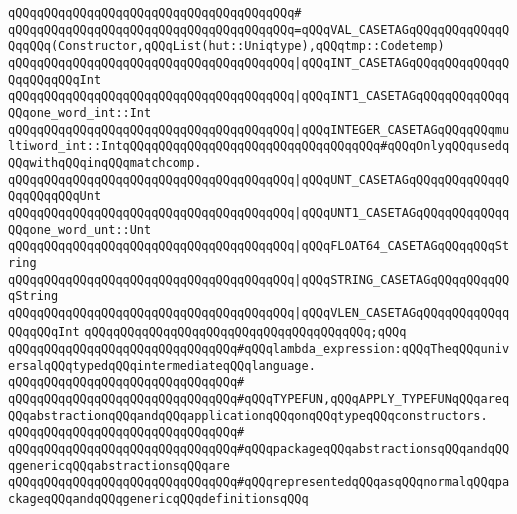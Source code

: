 \verb|qQQqqQQqqQQqqQQqqQQqqQQqqQQqqQQqqQQqqQQq#|\newline
\verb|qQQqqQQqqQQqqQQqqQQqqQQqqQQqqQQqqQQqqQQq=qQQqVAL_CASETAGqQQqqQQqqQQqqQQqqQQq(Constructor,qQQqList(hut::Uniqtype),qQQqtmp::Codetemp)|\newline
\verb|qQQqqQQqqQQqqQQqqQQqqQQqqQQqqQQqqQQqqQQq|\verb#|qQQqINT_CASETAGqQQqqQQqqQQqqQQqqQQqqQQqInt#\newline
\verb|qQQqqQQqqQQqqQQqqQQqqQQqqQQqqQQqqQQqqQQq|\verb#|qQQqINT1_CASETAGqQQqqQQqqQQqqQQqone_word_int::Int#\newline
\verb|qQQqqQQqqQQqqQQqqQQqqQQqqQQqqQQqqQQqqQQq|\verb#|qQQqINTEGER_CASETAGqQQqqQQqmultiword_int::IntqQQqqQQqqQQqqQQqqQQqqQQqqQQqqQQqqQQq#\verb|#qQQqOnlyqQQqusedqQQqwithqQQqinqQQqmatchcomp.|\newline
\verb|qQQqqQQqqQQqqQQqqQQqqQQqqQQqqQQqqQQqqQQq|\verb#|qQQqUNT_CASETAGqQQqqQQqqQQqqQQqqQQqqQQqUnt#\newline
\verb|qQQqqQQqqQQqqQQqqQQqqQQqqQQqqQQqqQQqqQQq|\verb#|qQQqUNT1_CASETAGqQQqqQQqqQQqqQQqone_word_unt::Unt#\newline
\verb|qQQqqQQqqQQqqQQqqQQqqQQqqQQqqQQqqQQqqQQq|\verb#|qQQqFLOAT64_CASETAGqQQqqQQqString#\newline
\verb|qQQqqQQqqQQqqQQqqQQqqQQqqQQqqQQqqQQqqQQq|\verb#|qQQqSTRING_CASETAGqQQqqQQqqQQqString#\newline
\verb|qQQqqQQqqQQqqQQqqQQqqQQqqQQqqQQqqQQqqQQq|\verb#|qQQqVLEN_CASETAGqQQqqQQqqQQqqQQqqQQqInt#\newline
\verb|qQQqqQQqqQQqqQQqqQQqqQQqqQQqqQQqqQQqqQQq;qQQq|\newline
\newline
\newline
\verb|qQQqqQQqqQQqqQQqqQQqqQQqqQQqqQQq#qQQqlambda_expression:qQQqTheqQQquniversalqQQqtypedqQQqintermediateqQQqlanguage.|\newline
\verb|qQQqqQQqqQQqqQQqqQQqqQQqqQQqqQQq#|\newline
\verb|qQQqqQQqqQQqqQQqqQQqqQQqqQQqqQQq#qQQqTYPEFUN,qQQqAPPLY_TYPEFUNqQQqareqQQqabstractionqQQqandqQQqapplicationqQQqonqQQqtypeqQQqconstructors.|\newline
\verb|qQQqqQQqqQQqqQQqqQQqqQQqqQQqqQQq#|\newline
\verb|qQQqqQQqqQQqqQQqqQQqqQQqqQQqqQQq#qQQqpackageqQQqabstractionsqQQqandqQQqgenericqQQqabstractionsqQQqare|\newline
\verb|qQQqqQQqqQQqqQQqqQQqqQQqqQQqqQQq#qQQqrepresentedqQQqasqQQqnormalqQQqpackageqQQqandqQQqgenericqQQqdefinitionsqQQq|\newline
